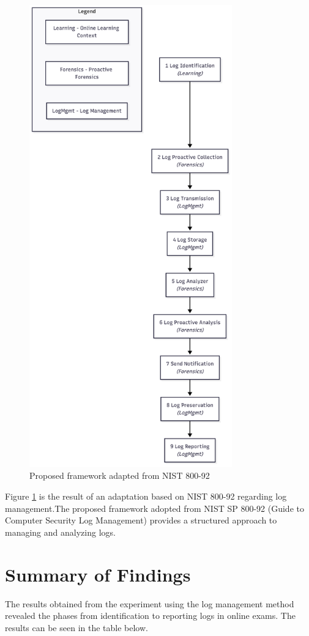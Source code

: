\begin{figure}[H]
    \centering
    \includegraphics[height=20cm, keepaspectratio]{figure/framework-adopted-nist-800-92.png}
    \caption{Proposed framework adapted from NIST 800-92}
    \label{fig:framework-proposed}
\end{figure}


Figure \ref{fig:framework-proposed} is the result of an adaptation based on NIST 800-92 regarding log management.The proposed framework adopted from NIST SP 800-92 (Guide to Computer Security Log Management) provides a structured approach to managing and analyzing logs.



\section{Summary of Findings}
The results obtained from the experiment using the log management method revealed the phases from identification to reporting logs in online exams. The results can be seen in the table below.

